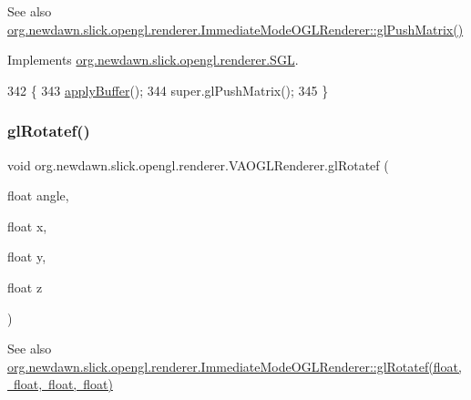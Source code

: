 \begin{DoxySeeAlso}{See also}
\mbox{\hyperlink{classorg_1_1newdawn_1_1slick_1_1opengl_1_1renderer_1_1_immediate_mode_o_g_l_renderer_ab8bdefea69c51370d849bd1fe814cc9d}{org.\+newdawn.\+slick.\+opengl.\+renderer.\+Immediate\+Mode\+O\+G\+L\+Renderer\+::gl\+Push\+Matrix()}} 
\end{DoxySeeAlso}


Implements \mbox{\hyperlink{interfaceorg_1_1newdawn_1_1slick_1_1opengl_1_1renderer_1_1_s_g_l_ae9904a980aa014796bf1dcd748b63056}{org.\+newdawn.\+slick.\+opengl.\+renderer.\+S\+GL}}.


\begin{DoxyCode}
342                                \{
343         \mbox{\hyperlink{classorg_1_1newdawn_1_1slick_1_1opengl_1_1renderer_1_1_v_a_o_g_l_renderer_a7c5d09419cd40761be8f849631aebab5}{applyBuffer}}();
344         super.glPushMatrix();
345     \}
\end{DoxyCode}
\mbox{\label{classorg_1_1newdawn_1_1slick_1_1opengl_1_1renderer_1_1_v_a_o_g_l_renderer_adfa62351752a9cfcd8cced6c76b0e05f}} 
\subsubsection{\texorpdfstring{gl\+Rotatef()}{glRotatef()}}
{\footnotesize\ttfamily void org.\+newdawn.\+slick.\+opengl.\+renderer.\+V\+A\+O\+G\+L\+Renderer.\+gl\+Rotatef (\begin{DoxyParamCaption}\item[{float}]{angle,  }\item[{float}]{x,  }\item[{float}]{y,  }\item[{float}]{z }\end{DoxyParamCaption})\hspace{0.3cm}{\ttfamily [inline]}}

\begin{DoxySeeAlso}{See also}
\mbox{\hyperlink{classorg_1_1newdawn_1_1slick_1_1opengl_1_1renderer_1_1_immediate_mode_o_g_l_renderer_a998aac166770b6e32bdd4ded87629701}{org.\+newdawn.\+slick.\+opengl.\+renderer.\+Immediate\+Mode\+O\+G\+L\+Renderer\+::gl\+Rotatef(float, float, float, float)}} 
\end{DoxySeeAlso}


